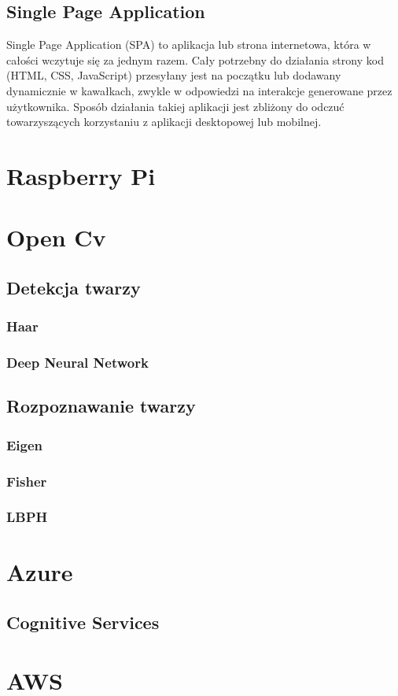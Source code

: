 \subsection{Single Page Application}
Single Page Application (SPA) to aplikacja lub strona internetowa, która w całości wczytuje się za jednym razem. Cały potrzebny do działania strony kod (HTML, CSS, JavaScript) przesyłany jest na początku lub dodawany dynamicznie w kawałkach, zwykle w odpowiedzi na interakcje generowane przez użytkownika.
Sposób działania takiej aplikacji jest zbliżony do odczuć towarzyszących korzystaniu z aplikacji desktopowej lub mobilnej.

\section{Raspberry Pi}

\section{Open Cv}

\subsection{Detekcja twarzy}
\subsubsection{Haar} \label{haar}
\subsubsection{Deep Neural Network} \label{dnn}

\subsection{Rozpoznawanie twarzy}
\subsubsection{Eigen} \label{eigen}
\subsubsection{Fisher} \label{fisher}
\subsubsection{LBPH} \label{lbph}

\section{Azure}
\subsection{Cognitive Services} \label{cognitive_services}

\section{AWS}

